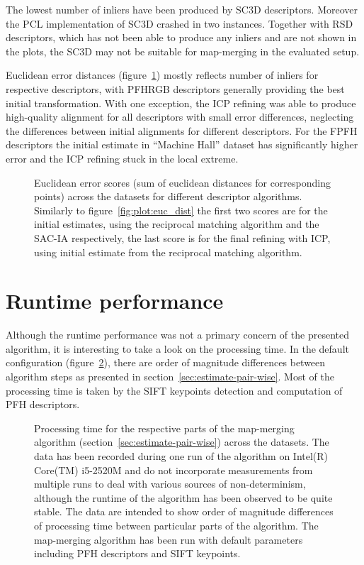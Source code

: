 The lowest number of inliers have been produced by \gls{SC3D} descriptors. Moreover the \gls{PCL} implementation of \gls{SC3D} crashed in two instances. Together with \gls{RSD} descriptors, which has not been able to produce any inliers and are not shown in the plots, the \gls{SC3D} may not be suitable for map-merging in the evaluated setup.

Euclidean error distances (figure~\ref{fig:plot:desc_dist}) mostly reflects number of inliers for respective descriptors, with \gls{PFHRGB} descriptors generally providing the best initial transformation. With one exception, the \gls{ICP} refining was able to produce high-quality alignment for all descriptors with small error differences, neglecting the differences between initial alignments for different descriptors. For the \gls{FPFH} descriptors the initial estimate in ``Machine Hall'' dataset has significantly higher error and the \gls{ICP} refining stuck in the local extreme.

\begin{figure}
  \centering
  
  \caption[Euclidean error scores per descriptors]{Euclidean error scores (sum of euclidean distances for corresponding points) across the datasets for different descriptor algorithms. Similarly to figure~\ref{fig:plot:euc_dist} the first two scores are for the initial estimates, using the reciprocal matching algorithm and the \gls{SAC-IA} respectively, the last score is for the final refining with \gls{ICP}, using initial estimate from the reciprocal matching algorithm.}
  \label{fig:plot:desc_dist}
\end{figure}

\section{Runtime performance}
\label{sec:runtime-perf}

Although the runtime performance was not a primary concern of the presented algorithm, it is interesting to take a look on the processing time. In the default configuration (figure~\ref{fig:plot:perf}), there are order of magnitude differences between algorithm steps as presented in section~\ref{sec:estimate-pair-wise}. Most of the processing time is taken by the \gls{SIFT} keypoints detection and computation of \gls{PFH} descriptors.

\begin{figure}
  \centering
  
  \caption[Processing time per algorithm parts]{Processing time for the respective parts of the map-merging algorithm (section~\ref{sec:estimate-pair-wise}) across the datasets. The data has been recorded during one run of the algorithm on Intel(R) Core(TM) i5-2520M and do not incorporate measurements from multiple runs to deal with various sources of non-determinism, although the runtime of the algorithm has been observed to be quite stable. The data are intended to show order of magnitude differences of processing time between particular parts of the algorithm. The map-merging algorithm has been run with default parameters including \gls{PFH} descriptors and \gls{SIFT} keypoints.}
  \label{fig:plot:perf}
\end{figure}

